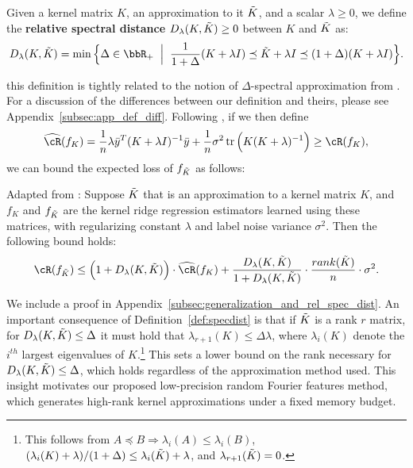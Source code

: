 \begin{definition}
	\label{def:specdist}
	Given a kernel matrix $K$, an approximation to it $\tilde{K}$, and a scalar $\lambda \geq 0$, we define the \textbf{relative spectral distance} $D_{\lambda}(K,\tilde{K})\geq 0$ between $K$ and $\tilde{K}$ as:
	$$D_{\lambda}(K,\tK) = \min \Big\{\Delta \in \RR_{+} \;\;\Big|\;\; \frac{1}{1+\Delta}(K+\lambda I) \preceq \tK + \lambda I \preceq (1+\Delta)(K+\lambda I)\Big\}.$$
\end{definition}

this definition is tightly related to the notion of $\Delta$-spectral approximation from \citet{avron17}. For a discussion of the differences between our definition and theirs, please see Appendix~\ref{subsec:app_def_diff}. Following \citet{avron17}, if we then define
$$\hcR(f_K) = \frac{1}{n}\lambda \by^T(K+\lambda I)^{-1}\by + \frac{1}{n}\sigma^2 \tr\Big(K(K+\lambda)^{-1}\Big) \geq \cR(f_K),$$
we can bound the expected loss of $f_{\tilde{K}}$ as follows:

\begin{proposition}{Adapted from \citep{avron17}:}
	\label{prop:avron}
	Suppose $\tilde{K}$ that is an approximation to a kernel matrix $K$, and $f_{K}$ and $f_{\tilde{K}}$ are the kernel ridge regression estimators learned using these matrices, with regularizing constant $\lambda$ and label noise variance $\sigma^2$. Then the following bound holds:
	\begin{eqnarray}
	\cR(f_{\tK}) \leq \Big(1+D_{\lambda}(K,\tK)\Big)\cdot \hcR(f_K) + \frac{D_{\lambda}(K,\tK)}{1+D_{\lambda}(K,\tK)}\cdot \frac{rank(\tK)}{n}\cdot\sigma^2.
	\end{eqnarray}
\end{proposition}
We include a proof in Appendix~\ref{subsec:generalization_and_rel_spec_dist}. An important consequence of Definition~\ref{def:specdist} is that if $\tilde{K}$ is a rank $r$ matrix, for $D_{\lambda}(K,\tilde{K}) \leq \Delta$ it must hold that $\lambda_{r+1}(K) \leq \Delta \lambda$, where $\lambda_i(K)$ denote the $i^{th}$ largest eigenvalues of $K$.\footnote{This follows from $A\preceq B \Rightarrow \lambda_i(A) \leq \lambda_i(B)$, $(\lambda_i(K) + \lambda)/(1+\Delta) \leq \lambda_i(\tilde{K}) + \lambda$, and $\lambda_{r+1}(\tilde{K}) = 0$.}  This sets a lower bound on the rank necessary for $D_{\lambda}(K,\tilde{K}) \leq \Delta$, which holds regardless of the approximation method used. This insight motivates our proposed low-precision random Fourier features method, which generates high-rank kernel approximations under a fixed memory budget.